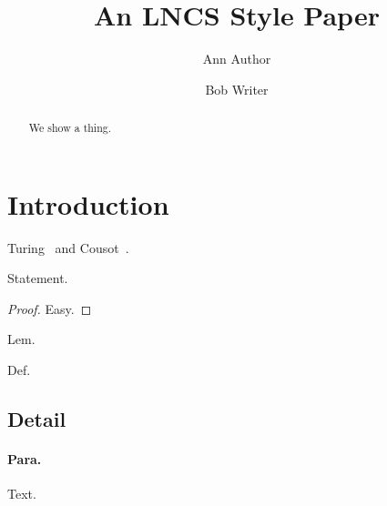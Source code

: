 \documentclass{llncs}
\begin{document}
\title{An LNCS Style Paper}
\author{Ann Author \and Bob Writer}
\maketitle
\begin{abstract}We show a thing.\end{abstract}
\section{Introduction}Turing~\cite{turing36} and Cousot~\cite{cousot77}.
\begin{theorem}Statement.\end{theorem}\begin{proof}Easy.\end{proof}
\begin{lemma}Lem.\end{lemma}\begin{definition}Def.\end{definition}
\subsection{Detail}\paragraph{Para.}Text.

\end{document}
